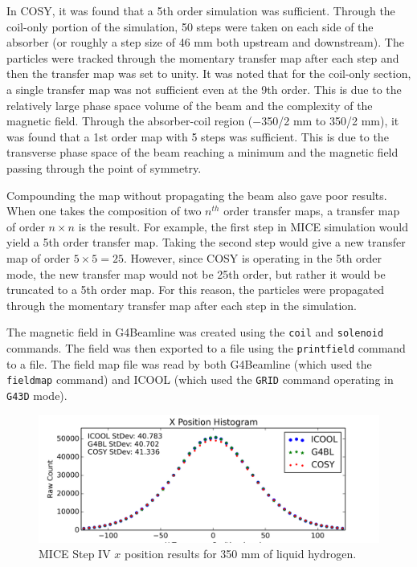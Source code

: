 \documentclass[a4paper,11pt]{article}
\begin{document}
In COSY, it was found that a 5th order simulation was sufficient. Through the coil-only portion of the simulation, 50 steps were taken on each side of the absorber (or roughly a step size of 46 mm both upstream and downstream). The particles were tracked through the momentary transfer map after each step and then the transfer map was set to unity. It was noted that for the coil-only section, a single transfer map was not sufficient even at the 9th order. This is due to the relatively large phase space volume of the beam and the complexity of the magnetic field. Through the absorber-coil region ($-$350/2 mm to 350/2 mm), it was found that a 1st order map with 5 steps was sufficient. This is due to the transverse phase space of the beam reaching a minimum and the magnetic field passing through the point of symmetry.

Compounding the map without propagating the beam also gave poor results. When one takes the composition of two $n^{th}$ order transfer maps, a transfer map of order $n\times n$ is the result. For example, the first step in MICE simulation would yield a 5th order transfer map. Taking the second step would give a new transfer map of order $5\times 5 = 25$. However, since COSY is operating in the 5th order mode, the new transfer map would not be 25th order, but rather it would be truncated to a 5th order map. For this reason, the particles were propagated through the momentary transfer map after each step in the simulation.

The magnetic field in G4Beamline was created using the \texttt{coil} and \texttt{solenoid} commands. The field was then exported to a file using the \texttt{printfield} command to a file. The field map file was read by both G4Beamline (which used the \texttt{fieldmap} command) and ICOOL (which used the \texttt{GRID} command operating in \texttt{G43D} mode).

\iffalse
\begin{figure}[htb]
  \centering
    \includegraphics[width=\columnwidth]{Figures/x} 
  \caption{MICE Step IV $x$ position results for 350 mm of liquid hydrogen.}
  \label{fig:micex}
\end{figure}
\end{document}
